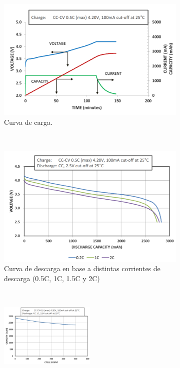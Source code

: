 \documentclass[10pt,a4paper]{article}
\begin{document}
	\begin{figure}[h!]
        \begin{subfigure}[t]{.5\textwidth}
    			\includegraphics[width=1\textwidth]{cc_cv_18650.png}
    			\caption{Curva de carga.}
    			\label{cc_cv_18650}
    	\end{subfigure}%
        ~ 
    	\begin{subfigure}[t]{.5\textwidth}
    			\includegraphics[width=1\textwidth]{discharge_18650.png}
    			\caption{Curva de descarga en base a distintas corrientes de descarga (0.5C, 1C, 1.5C y 2C)}
    			\label{descarga_18650}
    	\end{subfigure}
        ~ 
    	\begin{centering}
        	 \begin{subfigure}[t]{1\textwidth}
        	 	\centering
        	 		\includegraphics[width=0.5\textwidth]{life_cycle_18650.png}

\end{subfigure}
\end{centering}
\end{figure}
\end{document}
